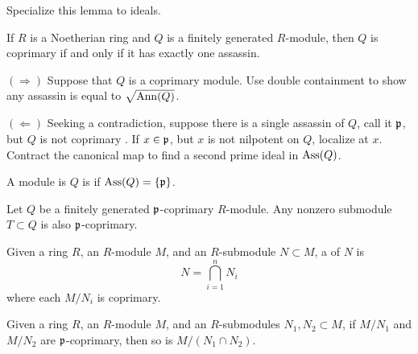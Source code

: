 \documentclass{ximera}
\begin{document}
\begin{exercise}
  Specialize this lemma to ideals.
\end{exercise}



\begin{lemma}
  If $R$ is a Noetherian ring and $Q$ is a finitely generated
  $R$-module, then $Q$ is coprimary if and only if it has exactly one
  assassin.
  \begin{sketch} 
    $(\Rightarrow)$ Suppose that $Q$ is a coprimary module. Use double
    containment to show any assassin is equal to $\sqrt{\operatorname{Ann}(Q)}$.

    
    $(\Leftarrow)$ Seeking a contradiction, suppose there is a single
    assassin of $Q$, call it $\mathfrak{p}$, but $Q$ is not coprimary . If $x\in
    \mathfrak{p}$, but $x$ is not nilpotent on $Q$, localize at $x$. Contract
    the canonical map to find a second prime ideal in $\operatorname{Ass}(Q)$.
  \end{sketch}
\end{lemma}


\begin{definition}
  A module is $Q$ is  if $\operatorname{Ass}(Q) = \{\mathfrak{p}\}$.
\end{definition}

\begin{lemma}
  Let $Q$ be a finitely generated $\mathfrak{p}$-coprimary $R$-module. Any
  nonzero submodule $T\subset Q$ is also $\mathfrak{p}$-coprimary.
  \begin{sketch}
  \end{sketch}
\end{lemma}




\begin{definition}
  Given a ring $R$, an $R$-module $M$, and an $R$-submodule $N\subset
  M$, a  of $N$ is
  \[
  N = \bigcap_{i=1}^n N_i
  \]
  where each $M/N_i$ is coprimary. 
\end{definition}


\begin{lemma}\label{L:intersectcoprimary}
  Given a ring $R$, an $R$-module $M$, and an $R$-submodules $N_1,N_2\subset
  M$, if $M/N_1$ and $M/N_2$ are $\mathfrak{p}$-coprimary, then so is $M/(N_1\cap N_2)$.
\end{lemma}
\end{document}
